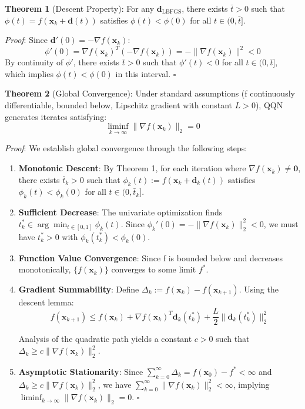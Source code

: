 \textbf{Theorem 1} (Descent Property): For any \(\mathbf{d}_{\text{LBFGS}}\), there exists \(\bar{t} > 0\) such that \(\phi(t) = f(\mathbf{x}_k + \mathbf{d}(t))\) satisfies \(\phi(t) < \phi(0)\) for all \(t \in (0, \bar{t}]\).

\emph{Proof}: Since \(\mathbf{d}'(0) = -\nabla f(\mathbf{x}_k)\):
\[\phi'(0) = \nabla f(\mathbf{x}_k)^T (-\nabla f(\mathbf{x}_k)) = -\|\nabla f(\mathbf{x}_k)\|^2 < 0\]
By continuity of \(\phi'\), there exists \(\bar{t} > 0\) such that \(\phi'(t) < 0\) for all \(t \in (0, \bar{t}]\), which implies \(\phi(t) < \phi(0)\) in this interval. \(\square\)

\textbf{Theorem 2} (Global Convergence): Under standard assumptions (f continuously differentiable, bounded below, Lipschitz gradient with constant \(L > 0\)), QQN generates iterates satisfying:
\[\liminf_{k \to \infty} \|\nabla f(\mathbf{x}_k)\|_2 = 0\]

\emph{Proof}: We establish global convergence through the following steps:

\begin{enumerate}
\def\labelenumi{\arabic{enumi}.}
\item
  \textbf{Monotonic Descent}: By Theorem 1, for each iteration where \(\nabla f(\mathbf{x}_k) \neq \mathbf{0}\), there exists \(\bar{t}_k > 0\) such that \(\phi_k(t) := f(\mathbf{x}_k + \mathbf{d}_k(t))\) satisfies \(\phi_k(t) < \phi_k(0)\) for all \(t \in (0, \bar{t}_k]\).
\item
  \textbf{Sufficient Decrease}: The univariate optimization finds \(t_k^* \in \arg\min_{t \in [0,1]} \phi_k(t)\).
  Since \(\phi_k'(0) = -\|\nabla f(\mathbf{x}_k)\|_2^2 < 0\), we must have \(t_k^* > 0\) with \(\phi_k(t_k^*) < \phi_k(0)\).
\item
  \textbf{Function Value Convergence}: Since f is bounded below and decreases monotonically, \(\{f(\mathbf{x}_k)\}\) converges to some limit \(f^*\).
\item
  \textbf{Gradient Summability}: Define \(\Delta_k := f(\mathbf{x}_k) - f(\mathbf{x}_{k+1})\). Using the descent lemma:
  \[f(\mathbf{x}_{k+1}) \leq f(\mathbf{x}_k) + \nabla f(\mathbf{x}_k)^T \mathbf{d}_k(t_k^*) + \frac{L}{2}\|\mathbf{d}_k(t_k^*)\|_2^2\]

  Analysis of the quadratic path yields a constant \(c > 0\) such that \(\Delta_k \geq c\|\nabla f(\mathbf{x}_k)\|_2^2\).
\item
  \textbf{Asymptotic Stationarity}: Since \(\sum_{k=0}^{\infty} \Delta_k = f(\mathbf{x}_0) - f^* < \infty\) and
  \(\Delta_k \geq c\|\nabla f(\mathbf{x}_k)\|_2^2\), we have \(\sum_{k=0}^{\infty} \|\nabla f(\mathbf{x}_k)\|_2^2 < \infty\),
  implying \(\liminf_{k \to \infty} \|\nabla f(\mathbf{x}_k)\|_2 = 0\). \(\square\)
\end{enumerate}

